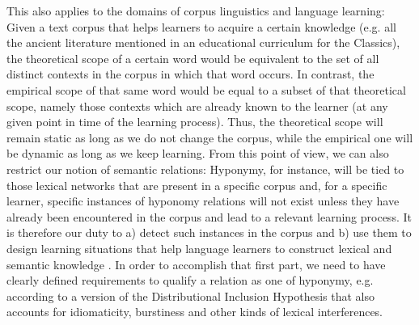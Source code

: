 \label{distributionalInclusionHypothesis}
This also applies to the domains of corpus linguistics and language learning: Given a text corpus that helps learners to acquire a certain knowledge (e.g. all the ancient literature mentioned in an educational curriculum for the Classics), the theoretical scope of a certain word would be equivalent to the set of all distinct contexts in the corpus in which that word occurs. In contrast, the empirical scope of that same word would be equal to a subset of that theoretical scope, namely those contexts which are already known to the learner (at any given point in time of the learning process). Thus, the theoretical scope will remain static as long as we do not change the corpus, while the empirical one will be dynamic as long as we keep learning. From this point of view, we can also restrict our notion of semantic relations: Hyponymy, for instance, will be tied to those lexical networks that are present in a specific corpus and, for a specific learner, specific instances of hyponomy relations will not exist unless they have already been encountered in the corpus and lead to a relevant learning process. It is therefore our duty to a) detect such instances in the corpus and b) use them to design learning situations that help language learners to construct lexical and semantic knowledge \parencite[25]{yorkConstructivistApproachGamebased2018}. In order to accomplish that first part, we need to have clearly defined requirements to qualify a relation as one of hyponymy, e.g. according to a version of the Distributional Inclusion Hypothesis \parencite[443]{rollerInclusiveSelectiveSupervised2014} that also accounts for idiomaticity, burstiness and other kinds of lexical interferences.

